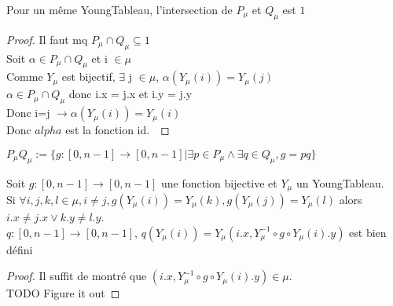 \begin{lemma}[sectPuQu]
    \label{sectPuQu}
    \leanok
    Pour un même YoungTableau, l'intersection de $P_{\mu}$ et $Q_{\mu}$ est ${1}$
\end{lemma}
\begin{proof}
    \leanok
    Il faut mq $P_{\mu} \cap Q_{\mu} \subseteq {1}$\\
    Soit $\alpha \in P_{\mu} \cap Q_{\mu}$ et i $\in \mu$\\
    Comme $Y_{\mu}$ est bijectif, $\exists$ j $\in \mu$, $\alpha ( Y_{\mu} (i)) = Y_{\mu} (j)$\\
    $\alpha \in P_{\mu} \cap Q_{\mu}$ donc i.x = j.x et i.y = j.y\\
    Donc i=j $\to \alpha(Y_{\mu}(i))=Y_{\mu}(i)$\\
    Donc $alpha$ est la fonction id.\
\end{proof}

\begin{definition}[PuQu]
    \label{PuQu}
    \leanok
    $P_{\mu}Q_{\mu} := \{g : [0,n-1] \to [0,n-1] | \exists p \in P_{\mu} \land \exists q \in Q_{\mu}, g = p q \}$
\end{definition}

\begin{lemma}[qWellDefined]
    \label{qWellDefined}
    Soit $g : [0,n-1] \to [0,n-1]$ une fonction bijective et $Y_{\mu}$ un YoungTableau.\\
    Si $\forall i, j, k, l \in \mu, i \neq j, g(Y_{\mu}(i)) = Y_{\mu}(k), g(Y_{\mu}(j)) = Y_{\mu}(l)$ alors $i.x \neq j.x \lor k.y \neq l.y$.\\
    $q : [0,n-1] \to [0,n-1]$, $q(Y_{\mu}(i)) = Y_{\mu}(i.x,Y_{\mu}^{-1} \circ g \circ Y_{\mu}(i).y)$ est bien défini
\end{lemma}
\begin{proof}
    Il suffit de montré que $(i.x,Y_{\mu}^{-1} \circ g \circ Y_{\mu}(i).y) \in \mu$.\\
    TODO Figure it out
\end{proof}

